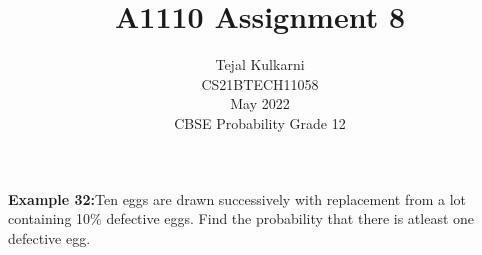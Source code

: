 \documentclass[journal,12pt,two column]{IEEEtran}
\title{A1110 Assignment 8 }
\author{Tejal Kulkarni \\ CS21BTECH11058 \\\vspace*{20pt} May 2022 \\ CBSE Probability Grade 12 }
\begin{document}
\newcommand{\solution}{\noindent \textbf{Solution: }}
\providecommand{\pr}[1]{\ensuremath{\Pr\left(#1\right)}}
\providecommand{\cdf}[2]{\ensuremath{\text{F}_{#1}\left(#2\right)}}
\providecommand{\qfunc}[1]{\ensuremath{Q\left(#1\right)}}
\providecommand{\sbrak}[1]{\ensuremath{{}\left[#1\right]}}
\providecommand{\lsbrak}[1]{\ensuremath{{}\left[#1\right.}}
\providecommand{\rsbrak}[1]{\ensuremath{{}\left.#1\right]}}
\providecommand{\brak}[1]{\ensuremath{\left(#1\right)}}
\providecommand{\lbrak}[1]{\ensuremath{\left(#1\right.}}
\providecommand{\rbrak}[1]{\ensuremath{\left.#1\right)}}
\providecommand{\cbrak}[1]{\ensuremath{\left\{#1\right\}}}
\providecommand{\lcbrak}[1]{\ensuremath{\left\{#1\right.}}
\providecommand{\rcbrak}[1]{\ensuremath{\left.#1\right\}}}
\newcommand*{\permcomb}[4][0mu]{{{}^{#3}\mkern#1#2_{#4}}}
\newcommand*{\perm}[1][-3mu]{\permcomb[#1]{P}}
\newcommand*{\comb}[1][-1mu]{\permcomb[#1]{C}}
\renewcommand{\thetable}{\arabic{table}} 

\maketitle

\textbf{Example 32:}Ten eggs are drawn successively with replacement from a lot containing 10\% defective eggs. Find the probability that there is atleast one defective egg. 
\end{document}
